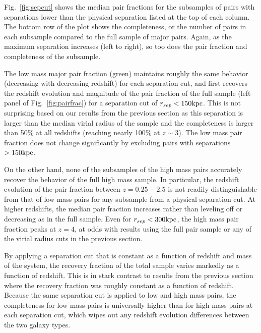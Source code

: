 \documentclass[twocolumn]{aastex631}
\begin{document}
    Fig.~\ref{fig:sepcut} shows the median pair fractions for the subsamples of pairs with separations lower than the physical separation listed at the top of each column. 
    The bottom row of the plot shows the completeness, or the number of pairs in each subsample compared to the full sample of major pairs. 
    Again, as the maximum separation increases (left to right), so too does the pair fraction and completeness of the subsample. 
    
    The low mass major pair fraction (green) maintains roughly the same behavior (decreasing with decreasing redshift) for each separation cut, and first recovers the redshift evolution and magnitude of the pair fraction of the full sample (left panel of Fig.~\ref{fig:pairfrac}) for a separation cut of $r_{sep} < 150\mathrm{kpc}$. 
    This is not surprising based on our results from the previous section as this separation is larger than the median virial radius of the sample and the completeness is larger than 50\% at all redshifts (reaching nearly 100\% at $z\sim3$).  
    The low mass pair fraction does not change significantly by excluding pairs with separations $>150\mathrm{kpc}$.

    On the other hand, none of the subsamples of the high mass pairs accurately recover the behavior of the full high mass sample. 
    In particular, the redshift evolution of the pair fraction between $z=0.25-2.5$ is not readily distinguishable from that of low mass pairs for any subsample from a physical separation cut.
    At higher redshifts, the median pair fraction increases rather than leveling off or decreasing as in the full sample.
    Even for $r_{sep}<300\mathrm{kpc}$, the high mass pair fraction peaks at $z=4$, at odds with results using the full pair sample or any of the virial radius cuts in the previous section. 

    By applying a separation cut that is constant as a function of redshift and mass of the system, the recovery fraction of the total sample varies markedly as a function of redshift.  
    This is in stark contrast to results from the previous section where the recovery fraction was roughly constant as a function of redshift.
    Because the same separation cut is applied to low and high mass pairs, the completeness for low mass pairs is universally higher than for high mass pairs at each separation cut, which wipes out any redshift evolution differences between the two galaxy types.
    
    
\end{document}
